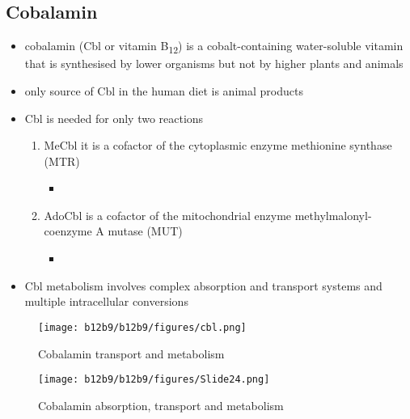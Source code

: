 \documentclass{scrartcl}
\begin{document}
\subsection{Cobalamin}
\label{sec:org4d33fa3}
\begin{itemize}
\item cobalamin (Cbl or vitamin B\textsubscript{12}) is a cobalt-containing
water-soluble vitamin that is synthesised by lower organisms but not
by higher plants and animals
\item only source of Cbl in the human diet is animal products
\item Cbl is needed for only two reactions
\begin{enumerate}
\item MeCbl it is a cofactor of the cytoplasmic enzyme methionine synthase (MTR)
\begin{itemize}
\item {}
\end{itemize}
\item AdoCbl is a cofactor of the mitochondrial enzyme methylmalonyl-coenzyme A mutase (MUT)
\begin{itemize}
\item {}
\end{itemize}
\end{enumerate}
\item Cbl metabolism involves complex absorption and transport systems and
multiple intracellular conversions
\end{itemize}


\begin{figure}[htbp]
\centering
\texttt{[image: b12b9/b12b9/figures/cbl.png]}
\caption{\label{fig:org33244aa}Cobalamin transport and metabolism}
\end{figure}

\begin{figure}[htbp]
\centering
\texttt{[image: b12b9/b12b9/figures/Slide24.png]}
\caption{\label{fig:org8f5148f}Cobalamin absorption, transport and metabolism}
\end{figure}
\end{document}
